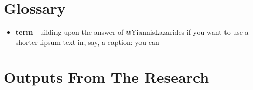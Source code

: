 
\setcounter{secnumdepth}{2}
\setcounter{tocdepth}{1}
\tableofcontents
\listoffigures 
\listoftables

\chapter*{Glossary} \label{front:glossary}

\begin{itemize}
  \item \textbf{term} - uilding upon the answer of @YiannisLazarides if you want to use a shorter lipsum text in, say, a caption: you can
\end{itemize}


\chapter*{Outputs From The Research} \label{front:outputs}


